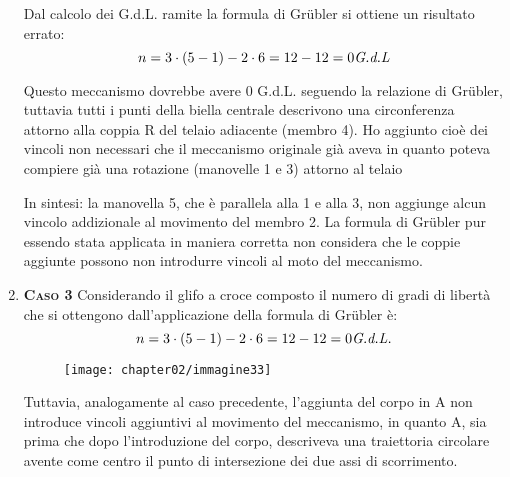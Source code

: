 \begin{enumerate}
		Dal calcolo dei G.d.L. ramite la formula di Gr\"ubler si ottiene un risultato errato:
		\begin{equation*}
			n = 3 \cdot (5 - 1) - 2 \cdot 6 = 12 - 12 = 0 \emph{G.d.L}
		\end{equation*}
		
		Questo meccanismo dovrebbe avere 0 G.d.L. seguendo la relazione di Gr\"ubler, tuttavia tutti i punti della biella centrale descrivono una circonferenza attorno alla coppia R del telaio adiacente (membro 4).
		Ho aggiunto cioè dei vincoli non necessari che il meccanismo originale già aveva in quanto poteva compiere già una rotazione (manovelle 1 e 3) attorno al telaio
		
		In sintesi: la manovella 5, che è parallela alla 1 e alla 3, non aggiunge alcun vincolo addizionale al movimento del membro 2.
		La formula di Gr\"ubler pur essendo stata applicata in maniera corretta non considera che le coppie aggiunte possono non introdurre vincoli al moto del meccanismo.

	\item {\scshape{\bfseries Caso 3}} \newline
	Considerando il glifo a croce composto il numero di gradi di libertà che si ottengono dall'applicazione della formula di Gr\"ubler è:
	\begin{equation*}
		n = 3 \cdot (5 - 1) - 2 \cdot 6 = 12 - 12 = 0 \emph{G.d.L.} 
	\end{equation*}
	\begin{figure}[h]
	\centering
	\texttt{[image: chapter02/immagine33]}
	\end{figure}
	
	Tuttavia, analogamente al caso precedente, l'aggiunta del corpo in A non introduce vincoli aggiuntivi al movimento del meccanismo, in quanto A, sia prima che dopo l'introduzione del corpo, descriveva una traiettoria circolare avente come centro il punto di intersezione dei due assi di scorrimento.
		\end{enumerate}
	
